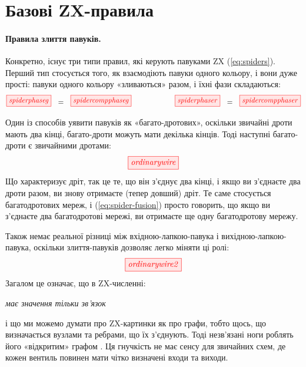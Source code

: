 \documentclass[11pt]{article}
\theoremstyle{definition}
\newcommand{\beq}{\begin{equation}}
\newcommand{\eeq}{\end{equation}\par\noindent}
\begin{document}
\section{Базові ZX-правила}

\paragraph{Правила злиття павуків.} Конкретно, існує три типи правил, які керують павуками ZX (\ref{eq:spiders}). Перший тип стосується того, як взаємодіють павуки одного кольору, і вони дуже прості: павуки одного кольору «зливаються» разом, і їхні фази складаються:
\beq\label{eq:spider-fusion}
\tikzfig{spiderphaseg}\ \ =\ \ \tikzfig{spidercompphaseg}  
\qquad\qquad\qquad
\tikzfig{spiderphaser}\ \ =\ \ \tikzfig{spidercompphaser}
\eeq

Один із способів уявити павуків як «багато-дротових», оскільки звичайні дроти мають два кінці, багато-дроти можуть мати декілька кінців. Тоді наступні багато-дроти є звичайними дротами:
\[
\tikzfig{ordinarywire}  
\]
Що характеризує дріт, так це те, що він з’єднує два кінці, і якщо ви з’єднаєте два дроти разом, ви знову отримаєте (тепер довший) дріт. Те саме стосується багатодротових мереж, і (\ref{eq:spider-fusion}) просто говорить, що якщо ви з’єднаєте два багатодротові мережі, ви отримаєте ще одну багатодротову мережу.

Також немає реальної різниці між вхідною-лапкою-павука і вихідною-лапкою-павука, оскільки злиття-павуків дозволяє легко міняти ці ролі:
\[
\tikzfig{ordinarywire2}  
\]
Загалом це означає, що в ZX-численні:
\begin{center}
\em  має значення тільки зв'язок
\end{center}
і що ми можемо думати про ZX-картинки як про графи, тобто щось, що визначається вузлами та ребрами, що їх з’єднують. Тоді незв'язані ноги роблять його «відкритим» графом \cite{DK}. Ця гнучкість не має сенсу для звичайних схем, де кожен вентиль повинен мати чітко визначені входи та виходи.
\end{document}
